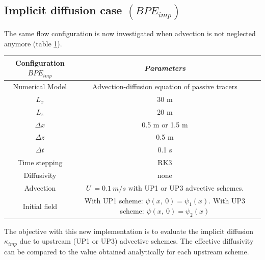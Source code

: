 \color{black}

\subsection{Implicit diffusion case $(BPE_{imp})$}
The same flow configuration is now investigated when advection is not neglected anymore (table \ref{tab_NUMLAB_imp}).
\begin{table}[h]
        \centering
        \begin{tabular}{|c|c|c|}
                \hline
                Configuration $BPE_{imp}$ & \textit{Parameters}\\
                \hline 
                Numerical Model & Advection-diffusion equation of passive tracers\\
                $L_x$ & 30 m\\
                $L_z$ & 20 m\\
                $\Delta x$ & 0.5 m or 1.5 m\\
                $\Delta z$ & 0.5 m\\
                $\Delta t$ & 0.1 s\\
                Time stepping & RK3 \\
                Diffusivity & none \\
                Advection & $U\ = 0.1\ m/s$ with UP1 or UP3 advective schemes.\\
                Initial field & With UP1 scheme: $\psi(x,\ 0)=\psi_1(x)$. With UP3 scheme: $\psi(x,\ 0)=\psi_2(x)$\\
                \hline
        \end{tabular}
        \label{tab_NUMLAB_imp}
\end{table}
The objective with this new implementation is to evaluate the implicit diffusion $\kappa_{imp}$ due to upstream (UP1 or UP3) advective schemes. The effective diffusivity can be compared to the value obtained analytically for each upstream scheme. 

